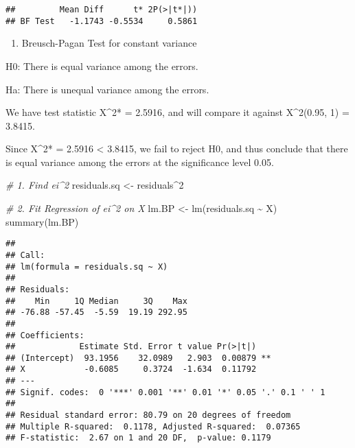 \documentclass[
]{article}
\newenvironment{Shaded}{\begin{snugshade}}{\end{snugshade}}
\newcommand{\CommentTok}[1]{\textcolor[rgb]{0.56,0.35,0.01}{\textit{#1}}}
\newcommand{\DecValTok}[1]{\textcolor[rgb]{0.00,0.00,0.81}{#1}}
\newcommand{\FunctionTok}[1]{\textcolor[rgb]{0.00,0.00,0.00}{#1}}
\newcommand{\NormalTok}[1]{#1}
\newcommand{\OtherTok}[1]{\textcolor[rgb]{0.56,0.35,0.01}{#1}}
\newcommand{\SpecialCharTok}[1]{\textcolor[rgb]{0.00,0.00,0.00}{#1}}
\providecommand{\tightlist}{%
  \setlength{\itemsep}{0pt}\setlength{\parskip}{0pt}}
\begin{document}
\begin{verbatim}
##         Mean Diff      t* 2P(>|t*|))
## BF Test   -1.1743 -0.5534     0.5861
\end{verbatim}

\begin{enumerate}
\def\labelenumi{\alph{enumi})}
\setcounter{enumi}{7}
\tightlist
\item
  Breusch-Pagan Test for constant variance
\end{enumerate}

H0: There is equal variance among the errors.

Ha: There is unequal variance among the errors.

We have test statistic X\^{}2* = 2.5916, and will compare it against
X\^{}2(0.95, 1) = 3.8415.

Since X\^{}2* = 2.5916 \textless{} 3.8415, we fail to reject H0, and
thus conclude that there is equal variance among the errors at the
significance level 0.05.

\begin{Shaded}
\begin{Highlighting}[]
\CommentTok{\# 1. Find ei\^{}2}
\NormalTok{residuals.sq }\OtherTok{\textless{}{-}}\NormalTok{ residuals}\SpecialCharTok{\^{}}\DecValTok{2}

\CommentTok{\# 2. Fit Regression of ei\^{}2 on X}
\NormalTok{lm.BP }\OtherTok{\textless{}{-}} \FunctionTok{lm}\NormalTok{(residuals.sq }\SpecialCharTok{\textasciitilde{}}\NormalTok{ X)}
\FunctionTok{summary}\NormalTok{(lm.BP)}
\end{Highlighting}
\end{Shaded}

\begin{verbatim}
## 
## Call:
## lm(formula = residuals.sq ~ X)
## 
## Residuals:
##    Min     1Q Median     3Q    Max 
## -76.88 -57.45  -5.59  19.19 292.95 
## 
## Coefficients:
##             Estimate Std. Error t value Pr(>|t|)   
## (Intercept)  93.1956    32.0989   2.903  0.00879 **
## X            -0.6085     0.3724  -1.634  0.11792   
## ---
## Signif. codes:  0 '***' 0.001 '**' 0.01 '*' 0.05 '.' 0.1 ' ' 1
## 
## Residual standard error: 80.79 on 20 degrees of freedom
## Multiple R-squared:  0.1178, Adjusted R-squared:  0.07365 
## F-statistic:  2.67 on 1 and 20 DF,  p-value: 0.1179
\end{verbatim}
\end{document}
